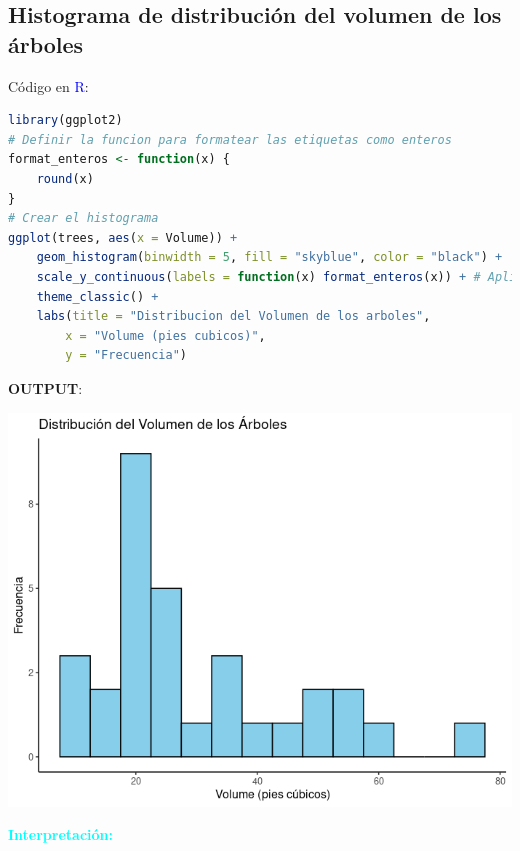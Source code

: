 \documentclass{article}
\begin{document}
\subsection{Histograma de distribución del volumen de los árboles}
Código en \textcolor{blue}{R}:
\begin{lstlisting}[language=R, caption=Histograma de distribución del volumen de los árboles]
library(ggplot2)
# Definir la funcion para formatear las etiquetas como enteros
format_enteros <- function(x) {
    round(x)
}
# Crear el histograma
ggplot(trees, aes(x = Volume)) +
    geom_histogram(binwidth = 5, fill = "skyblue", color = "black") +
    scale_y_continuous(labels = function(x) format_enteros(x)) + # Aplicar la funcion para formatear las etiquetas
    theme_classic() +
    labs(title = "Distribucion del Volumen de los arboles",
        x = "Volume (pies cubicos)",
        y = "Frecuencia")
\end{lstlisting}
\newpage
\textbf{OUTPUT}:
\begin{center} 
\includegraphics[width=1.0\textwidth]{code/Plots/histograma.png}
\end{center}
\large\textbf{\textcolor{cyan}{Interpretación:}}
\end{document}
